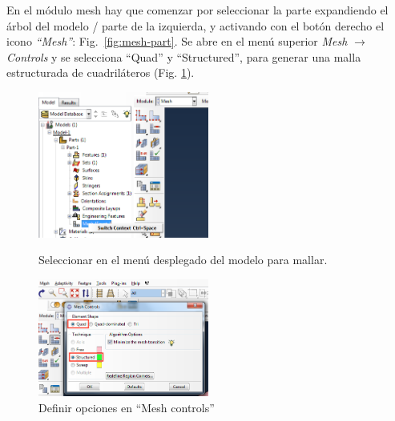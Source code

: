 \documentclass[spanish,a4paper,12pt]{article}
\begin{document}
En el módulo mesh hay que comenzar por seleccionar la parte expandiendo el árbol del modelo / parte de la izquierda, y activando con el botón derecho el icono \emph{``Mesh''}:
Fig.~\ref{fig:mesh-part}.
Se abre en el menú superior \emph{Mesh} $\to$ \emph{Controls} y se selecciona ``Quad'' y ``Structured'', para generar una malla estructurada de cuadriláteros
(Fig. \ref{fig:mesh-controls}).
\begin{figure}[h!tp]
\parbox[t]{0.49\textwidth}{%
\includegraphics[width=0.5\textwidth]{capturas/29-mesh.png}
\caption{Seleccionar en el menú desplegado del modelo para mallar.}
\label{fig:mesh-part}%
}\quad
\parbox[t]{0.49\textwidth}{%
\includegraphics[width=0.5\textwidth]{capturas/30-mesh-x.png}
\caption{Definir opciones en ``Mesh controls''}
\label{fig:mesh-controls}%
}%
\end{figure}
\end{document}
